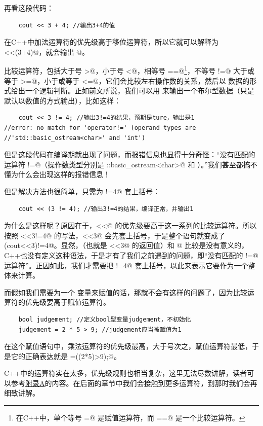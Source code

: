 再看这段代码：
\begin{lstlisting}
    cout << 3 + 4; //输出3+4的值
\end{lstlisting}
在C++中加法运算符的优先级高于移位运算符，所以它就可以解释为 \lstinline@cout<<(3+4)@，就会输出 @。\par
比较运算符，包括大于号 \lstinline@>@，小于号 \lstinline@<@，相等号 \lstinline@==@\footnote{在C++中，单个等号 \lstinline@=@ 是赋值运算符，而 \lstinline@==@ 是一个比较运算符。}，不等号 \lstinline@!=@ 大于或等于 \lstinline@>=@，小于或等于 \lstinline@<=@，它们会比较左右操作数的关系，然后以 \lstinline@bool@ 数据的形式给出一个逻辑判断。正如前文所说，我们可以用 \lstinline@cout@ 来输出一个布尔型数据（只是默认以数值的方式输出），比如这样：
\begin{lstlisting}
    cout << 3 != 4; //输出3!=4的结果，预期是ture，输出是1
//error: no match for 'operator!=' (operand types are
//'std::basic_ostream<char>' and 'int')
\end{lstlisting}
但是这段代码在编译期就出现了问题，而报错信息也显得十分奇怪：``没有匹配的运算符 \lstinline@!=@（操作数类型分别是 \lstinline@std::basic_ostream<char>@ 和 \lstinline@int@）。''我们甚至都搞不懂为什么会出现这样的报错信息！\par
但是解决方法也很简单，只需为 !=4@ 套上括号：
\begin{lstlisting}
    cout << (3 != 4); //输出3!=4的结果，编译正常，并输出1
\end{lstlisting}\par
为什么是这样呢？原因在于，\lstinline@<<@ 的优先级要高于这一系列的比较运算符。所以按照 \lstinline@cout<<3!=4@ 的写法，\lstinline@cout<<3@ 会先套上括号，于是整个语句就变成了 \lstinline@(cout<<3)!=4@。显然，\lstinline@cout@（也就是 \lstinline@cout<<3@ 的返回值）和 @ 比较是没有意义的，C++也没有定义这种语法，于是才有了我们之前遇到的问题，即``没有匹配的 \lstinline@!=@ 运算符''。正因如此，我们才需要把 !=4@ 套上括号，以此来表示它要作为一个整体来计算。\par
而假如我们需要为一个 \lstinline@bool@ 变量来赋值的话，那就不会有这样的问题了，因为比较运算符的优先级要高于赋值运算符。\par
\begin{lstlisting}
    bool judgement; //定义bool型变量judgement，不初始化
    judgement = 2 * 5 > 9; //judgement应当被赋值为1
\end{lstlisting}
在这个赋值语句中，乘法运算符的优先级最高，大于号次之，赋值运算符最低，于是它的正确表达就是 \lstinline@judgement=((2*5)>9);@。\par
C++中的运算符实在太多，优先级规则也相当复杂，这里无法尽数讲解，读者可以参考\hyperref[ch:appendix_A]{附录A}的内容。在后面的章节中我们会接触到更多运算符，到那时我们会再细致讲解。\par
